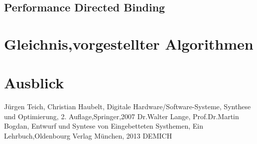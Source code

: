 \documentclass[conference]{IEEEtran}
\begin{document}
\subsection{Performance Directed Binding}
\section{Gleichnis,vorgestellter Algorithmen}
\section{Ausblick}

\begin{thebibliography}{00}
 Jürgen Teich, Christian Haubelt, Digitale Hardware/Software-Systeme, Synthese und Optimierung, 2. Auflage,Springer,2007
 Dr.Walter Lange, Prof.Dr.Martin Bogdan, Entwurf und Syntese von Eingebetteten Systhemen, Ein Lehrbuch,Oldenbourg Verlag München, 2013
 DEMICH
\end{thebibliography}
\vspace{12pt}
\end{document}
